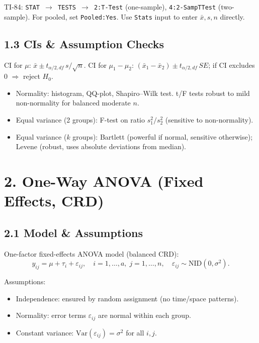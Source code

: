 \documentclass[9pt,letterpaper]{article}
\begin{document}
\begin{calcbox}
TI-84: \texttt{STAT $\to$ TESTS $\to$ 2:T-Test} (one-sample), \texttt{4:2-SampTTest} (two-sample). For pooled, set \texttt{Pooled:Yes}. Use \texttt{Stats} input to enter $\bar{x},s,n$ directly.
\end{calcbox}

\subsection{1.3 CIs \& Assumption Checks}

CI for $\mu$: $\bar{x} \pm t_{\alpha/2,df}\, s/\sqrt{n}$. CI for $\mu_1-\mu_2$: $(\bar{x}_1-\bar{x}_2) \pm t_{\alpha/2,df}\,SE$; if CI excludes 0 $\Rightarrow$ reject $H_0$.

\begin{itemize}
    \item Normality: histogram, QQ-plot, Shapiro--Wilk test. t/F tests robust to mild non-normality for balanced moderate $n$.
    \item Equal variance (2 groups): F-test on ratio $s_1^2/s_2^2$ (sensitive to non-normality).
    \item Equal variance ($k$ groups): Bartlett (powerful if normal, sensitive otherwise); Levene (robust, uses absolute deviations from median).
\end{itemize}

\section{2. One-Way ANOVA (Fixed Effects, CRD)}

\subsection{2.1 Model \& Assumptions}

One-factor fixed-effects ANOVA model (balanced CRD):
\[
y_{ij}=\mu+\tau_i+\varepsilon_{ij},\quad i=1,\ldots,a,\; j=1,\ldots,n,\quad \varepsilon_{ij}\sim\text{NID}(0,\sigma^2).
\]

Assumptions:
\begin{itemize}
    \item Independence: ensured by random assignment (no time/space patterns).
    \item Normality: error terms $\varepsilon_{ij}$ are normal within each group.
    \item Constant variance: $\text{Var}(\varepsilon_{ij})=\sigma^2$ for all $i,j$.
\end{itemize}
\end{document}
